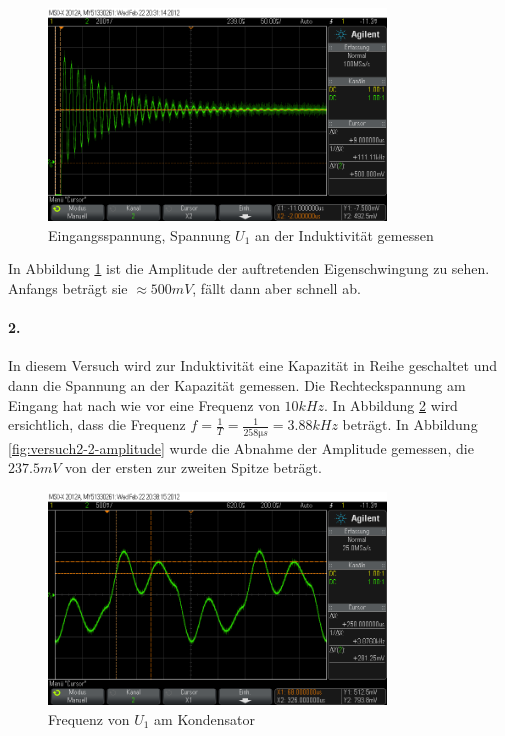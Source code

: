 \documentclass[a4paper]{article}
\begin{document}
\begin{figure}[H]
    \centering
    \includegraphics[width=0.8\textwidth]{versuch2_1_amplitude.png}
    \caption{Eingangsspannung, Spannung $U_1$ an der Induktivität gemessen}
    \label{fig:versuch2-1-amplitude}
\end{figure}

In Abbildung \ref{fig:versuch2-1-amplitude} ist die Amplitude der auftretenden Eigenschwingung zu sehen. Anfangs  beträgt sie $\approx 500\si{mV}$, fällt dann aber schnell ab.

\paragraph{2.}
In diesem Versuch wird zur Induktivität eine Kapazität in Reihe geschaltet und dann die Spannung an der Kapazität gemessen. Die Rechteckspannung am Eingang hat nach wie vor eine Frequenz von $10\si{kHz}$.
In Abbildung \ref{fig:versuch2-2-frequenz} wird ersichtlich, dass die Frequenz $f=\frac{1}{T}=\frac{1}{258\si{\micro s}}=3.88\si{kHz}$ beträgt. In Abbildung \ref{fig:versuch2-2-amplitude} wurde die Abnahme der Amplitude gemessen, die $237.5\si{mV}$ von der ersten zur zweiten Spitze beträgt.

\begin{figure}[H]
    \centering
    \includegraphics[width=0.8\textwidth]{versuch2_2_frequenz.png}
    \caption{Frequenz von $U_1$ am Kondensator}
    \label{fig:versuch2-2-frequenz}
\end{figure}
\end{document}
